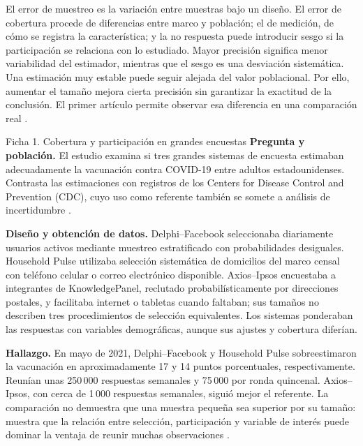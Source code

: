 {El error de muestreo es la variación entre muestras bajo un diseño. El error de cobertura procede de diferencias entre marco y población; el de medición, de cómo se registra la característica; y la no respuesta puede introducir sesgo si la participación se relaciona con lo estudiado. Mayor precisión significa menor variabilidad del estimador, mientras que el sesgo es una desviación sistemática. Una estimación muy estable puede seguir alejada del valor poblacional. Por ello, aumentar el tamaño mejora cierta precisión sin garantizar la exactitud de la conclusión. El primer artículo permite observar esa diferencia en una comparación real \citep{holmesBusiness2023,bradley2021}.

\begin{fichainvestigacion}{Ficha 1. Cobertura y participación en grandes encuestas}
\textbf{Pregunta y población.} El estudio examina si tres grandes sistemas de encuesta estimaban adecuadamente la vacunación contra COVID-19 entre adultos estadounidenses. Contrasta las estimaciones con registros de los Centers for Disease Control and Prevention (CDC), cuyo uso como referente también se somete a análisis de incertidumbre \citep{bradley2021}.

\textbf{Diseño y obtención de datos.} Delphi--Facebook seleccionaba diariamente usuarios activos mediante muestreo estratificado con probabilidades desiguales. Household Pulse utilizaba selección sistemática de domicilios del marco censal con teléfono celular o correo electrónico disponible. Axios--Ipsos encuestaba a integrantes de KnowledgePanel, reclutado probabilísticamente por direcciones postales, y facilitaba internet o tabletas cuando faltaban; sus tamaños no describen tres procedimientos de selección equivalentes. Los sistemas ponderaban las respuestas con variables demográficas, aunque sus ajustes y cobertura diferían.

\textbf{Hallazgo.} En mayo de 2021, Delphi--Facebook y Household Pulse sobreestimaron la vacunación en aproximadamente 17 y 14 puntos porcentuales, respectivamente. Reunían unas 250\,000 respuestas semanales y 75\,000 por ronda quincenal. Axios--Ipsos, con cerca de 1\,000 respuestas semanales, siguió mejor el referente. La comparación no demuestra que una muestra pequeña sea superior por su tamaño: muestra que la relación entre selección, participación y variable de interés puede dominar la ventaja de reunir muchas observaciones \citep{bradley2021}.


\end{fichainvestigacion}}
